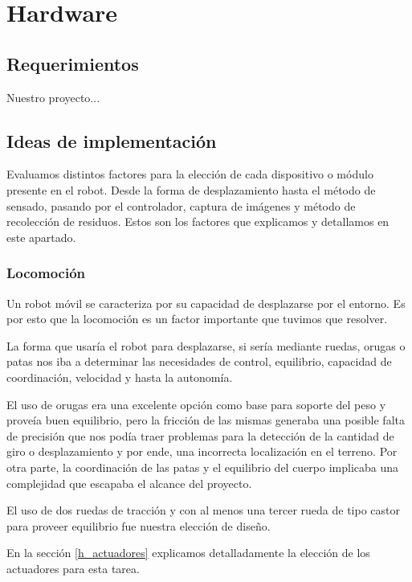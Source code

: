 \section{Hardware}
\label{h_hardware}

\subsection{Requerimientos}
\label{h_requerimientos}

Nuestro proyecto...


\subsection{Ideas de implementaci\'on}
\label{h_ideas}

Evaluamos distintos factores para la elecci\'on de cada dispositivo o m\'odulo presente en el robot.
Desde la forma de desplazamiento hasta el m\'etodo de sensado, pasando por el controlador, captura
de im\'agenes y m\'etodo de recolecci\'on de residuos.
Estos son los factores que explicamos y detallamos en este apartado.

\subsubsection{Locomoci\'on}
\label{h_ideas_locomocion}

Un robot m\'ovil se caracteriza por su capacidad de desplazarse por el entorno.
Es por esto que la locomoci\'on es un factor importante que tuvimos que resolver.

La forma que usar\'ia el robot para desplazarse, si ser\'ia mediante ruedas, orugas o patas nos
iba a determinar las necesidades de control, equilibrio, capacidad de coordinaci\'on, velocidad
y hasta la autonom\'ia.

El uso de orugas era una excelente opci\'on como base para soporte del peso y prove\'ia buen
equilibrio, pero la fricci\'on de las mismas generaba una posible falta de precisi\'on que nos
pod\'ia traer problemas para la detecci\'on de la cantidad de giro o desplazamiento y por ende,
una incorrecta localizaci\'on en el terreno.
Por otra parte, la coordinaci\'on de las patas y el equilibrio del cuerpo implicaba una
complejidad que escapaba el alcance del proyecto.

El uso de dos ruedas de tracci\'on y con al menos una tercer rueda de tipo castor para proveer
equilibrio fue nuestra elecci\'on de dise\~no.

En la secci\'on \ref{h_actuadores} explicamos detalladamente la elecci\'on de los actuadores
para esta tarea.


